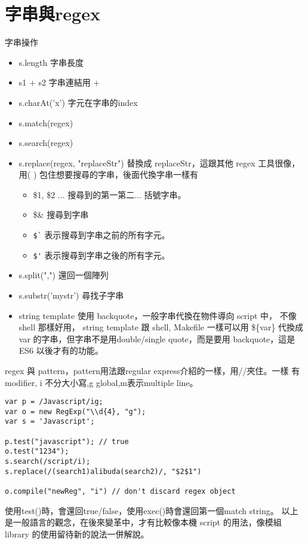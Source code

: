 \section{字串與regex}
字串操作
\begin{itemize}
  \item s.length 字串長度
  \item s1 + s2 字串連結用 +
  \item s.charAt('x') 字元在字串的index
  \item s.match(regex)
  \item s.search(regex)
  \item s.replace(regex, "replaceStr") 替換成 replaceStr，這跟其他 regex
    工具很像，用( ) 包住想要搜尋的字串，後面代換字串一樣有
    \begin{itemize}
      \item \$1, \$2 ... 搜尋到的第一第二... 括號字串。
      \item \$\& 搜尋到字串
      \item \verb=$`= 表示搜尋到字串之前的所有字元。
      \item \verb=$'= 表示搜尋到字串之後的所有字元。
    \end{itemize}
  \item s.split(",") 還回一個陣列
  \item s.substr('mystr') 尋找子字串
  \item string template 使用 backquote，一般字串代換在物件導向 script 中，
    不像 shell 那樣好用， string template 跟 shell, Makefile 一樣可以用
    \$\{var\} 代換成 var 的字串，但字串不是用double/single quote，而是要用
    backquote，這是 ES6 以後才有的功能。
\end{itemize}
regex 與 pattern，pattern用法跟regular express介紹的一樣，用//夾住。一樣
有modifier, i 不分大小寫,g global,m表示multiple line。
\begin{verbatim}
var p = /Javascript/ig;
var o = new RegExp("\\d{4}, "g");
var s = 'Javascript';

p.test("javascript"); // true
o.test("1234");
s.search(/script/i);
s.replace(/(search1)alibuda(search2)/, "$2$1")

o.compile("newReg", "i") // don't discard regex object
\end{verbatim}
使用test()時，會還回true/false，使用exec()時會還回第一個match string。
以上是一般語言的觀念，在後來變革中，才有比較像本機 script 的用法，像模組
library 的使用留待新的說法一併解說。

